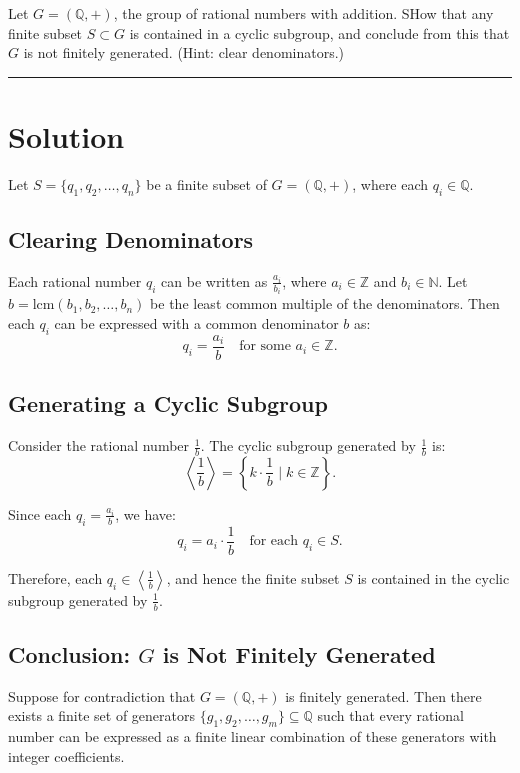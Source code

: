 \documentclass[12pt]{amsart}
\theoremstyle{definition}
\numberwithin{equation}{section}
\newcommand{\Z}{\mathbb{Z}}
\newcommand{\Q}{\mathbb{Q}}
\newcommand{\N}{\mathbb{N}}
\begin{document}
\begin{exercise}{6} Let \(G=(\Q, +)\), the group of rational numbers with addition. SHow that any finite subset \(S \subset G\) is contained in a cyclic subgroup, and conclude from this that \(G\) is not finitely generated. (Hint: clear denominators.)

    \noindent\rule{\linewidth}{1pt}

    \section*{Solution}

    Let \(S = \{q_1, q_2, \ldots, q_n\}\) be a finite subset of \(G = (\Q, +)\), where each \(q_i \in \Q\).

    \subsection*{Clearing Denominators}

    Each rational number \(q_i\) can be written as \(\frac{a_i}{b_i}\), where \(a_i \in \Z\) and \(b_i \in \N\). Let \(b = \text{lcm}(b_1, b_2, \ldots, b_n)\) be the least common multiple of the denominators. Then each \(q_i\) can be expressed with a common denominator \(b\) as:
    \[
    q_i = \frac{a_i}{b} \quad \text{for some } a_i \in \Z.
    \]

    \subsection*{Generating a Cyclic Subgroup}

    Consider the rational number \(\frac{1}{b}\). The cyclic subgroup generated by \(\frac{1}{b}\) is:
    \[
    \left\langle \frac{1}{b} \right\rangle = \left\{ k \cdot \frac{1}{b} \mid k \in \Z \right\}.
    \]
    
    Since each \(q_i = \frac{a_i}{b}\), we have:
    \[
    q_i = a_i \cdot \frac{1}{b} \quad \text{for each } q_i \in S.
    \]
    
    Therefore, each \(q_i \in \left\langle \frac{1}{b} \right\rangle\), and hence the finite subset \(S\) is contained in the cyclic subgroup generated by \(\frac{1}{b}\).

    \subsection*{Conclusion: \(G\) is Not Finitely Generated}

    Suppose for contradiction that \(G = (\Q, +)\) is finitely generated. Then there exists a finite set of generators \(\{g_1, g_2, \ldots, g_m\} \subseteq \Q\) such that every rational number can be expressed as a finite linear combination of these generators with integer coefficients.


\end{exercise}
\end{document}
